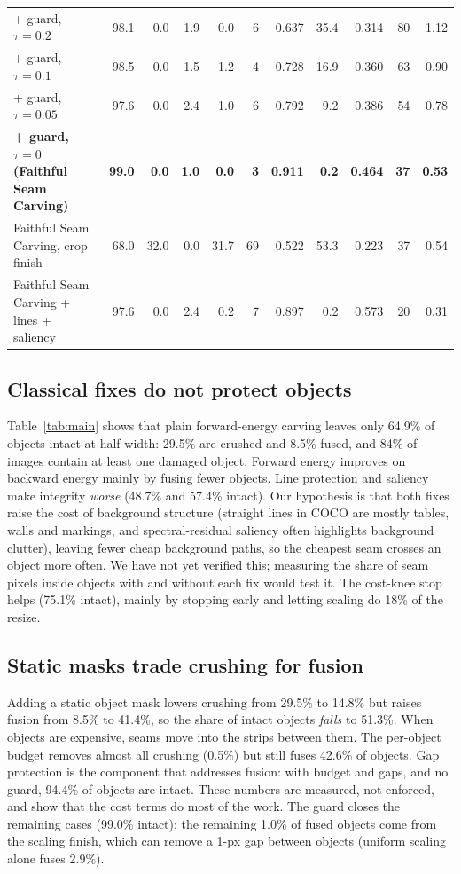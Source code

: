 \documentclass[conference]{IEEEtran}
\newcommand{\ours}{Faithful Seam Carving}
\newcommand{\best}[1]{\textbf{#1}}
\begin{document}
\begin{table}[t]
\begin{tabular}{lrrrrrrrrrr}
\quad + guard, $\tau = 0.2$ & 98.1 & 0.0 & 1.9 & 0.0 & 6 & 0.637 & 35.4 & 0.314 & 80 & 1.12 \\
\quad + guard, $\tau = 0.1$ & 98.5 & 0.0 & 1.5 & 1.2 & 4 & 0.728 & 16.9 & 0.360 & 63 & 0.90 \\
\quad + guard, $\tau = 0.05$ & 97.6 & 0.0 & 2.4 & 1.0 & 6 & 0.792 & 9.2 & 0.386 & 54 & 0.78 \\
\quad \best{+ guard, $\tau = 0$ (\ours{})} & \best{99.0} & \best{0.0} & \best{1.0} & \best{0.0} & \best{3} & \best{0.911} & \best{0.2} & \best{0.464} & \best{37} & \best{0.53} \\
\midrule
\ours{}, crop finish & 68.0 & 32.0 & 0.0 & 31.7 & 69 & 0.522 & 53.3 & 0.223 & 37 & 0.54 \\
\ours{} + lines + saliency & 97.6 & 0.0 & 2.4 & 0.2 & 7 & 0.897 & 0.2 & 0.573 & 20 & 0.31 \\
\bottomrule
\end{tabular}
\end{table}


\subsection{Classical fixes do not protect objects}
Table~\ref{tab:main} shows that plain forward-energy carving leaves only 64.9\% of objects intact at half width: 29.5\% are crushed and 8.5\% fused, and 84\% of images contain at least one damaged object. Forward energy improves on backward energy mainly by fusing fewer objects. Line protection and saliency make integrity \emph{worse} (48.7\% and 57.4\% intact). Our hypothesis is that both fixes raise the cost of background structure (straight lines in COCO are mostly tables, walls and markings, and spectral-residual saliency often highlights background clutter), leaving fewer cheap background paths, so the cheapest seam crosses an object more often. We have not yet verified this; measuring the share of seam pixels inside objects with and without each fix would test it. The cost-knee stop helps (75.1\% intact), mainly by stopping early and letting scaling do 18\% of the resize.

\subsection{Static masks trade crushing for fusion}
Adding a static object mask lowers crushing from 29.5\% to 14.8\% but raises fusion from 8.5\% to 41.4\%, so the share of intact objects \emph{falls} to 51.3\%. When objects are expensive, seams move into the strips between them. The per-object budget removes almost all crushing (0.5\%) but still fuses 42.6\% of objects. Gap protection is the component that addresses fusion: with budget and gaps, and no guard, 94.4\% of objects are intact. These numbers are measured, not enforced, and show that the cost terms do most of the work. The guard closes the remaining cases (99.0\% intact); the remaining 1.0\% of fused objects come from the scaling finish, which can remove a 1-px gap between objects (uniform scaling alone fuses 2.9\%).
\end{document}
